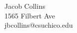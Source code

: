 \documentclass[twocolumn]{cinc}
\begin{document}
  
  
      


\begin{correspondence}
Jacob Collins\\
1565 Filbert Ave\\
jbcollins@csuchico.edu
\end{correspondence}
\end{document}
